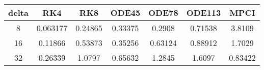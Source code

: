 \begin{tabular}{ccccccc}
\hline
delta & RK4 & RK8 & ODE45 & ODE78 & ODE113 & MPCI\\ 
\hline 
8 & 0.063177 & 0.24865 & 0.33375 & 0.2908 & 0.71538 & 3.8109\\ 
16 & 0.11866 & 0.53873 & 0.35256 & 0.63124 & 0.88912 & 1.7029\\ 
32 & 0.26339 & 1.0797 & 0.65632 & 1.2845 & 1.6097 &  0.83422\\ 
\hline 
\end{tabular}